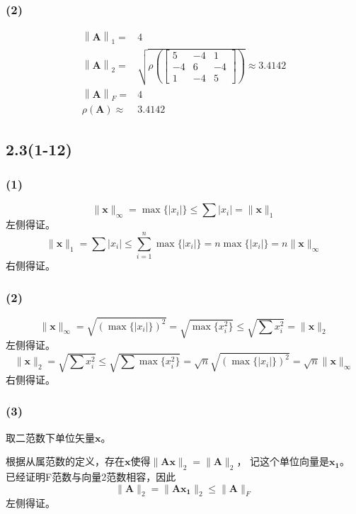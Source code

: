 \documentclass[UTF8,zihao=5]{ctexart}
\newcommand{\bm}[1]{{\mathbf{#1}}}
\begin{document}
\subsubsection*{(2)}
\begin{equation*}
    \begin{aligned}
        \left\|\bm{A}\right\|_1 =& 4\\
        \left\|\bm{A}\right\|_2 =& \sqrt{\rho\left(
            \begin{bmatrix}
                5 & -4 & 1\\-4 & 6 & -4\\1 & -4 & 5
            \end{bmatrix}
        \right)}\approx3.4142\\
        \left\|\bm{A}\right\|_F =& 4\\
        \rho(\bm{A})\approx&3.4142
    \end{aligned}
\end{equation*}

\subsection*{2.3(1-12)}
\subsubsection*{(1)}
$$
\|\bm{x}\|_\infty = \max{\{|x_i|\}}\leq\sum{|x_i|} = \|\bm{x}\|_1
$$
左侧得证。
$$
\|\bm{x}\|_1=\sum{|x_i|}\leq\sum_{i=1}^n{\max{\{|x_i|\}}}=n\max{\{|x_i|\}}
=n\|\bm{x}\|_\infty
$$
右侧得证。

\subsubsection*{(2)}
$$
\|\bm{x}\|_\infty = \sqrt{(\max{\{|x_i|\}})^2}
=\sqrt{\max{\{x_i^2\}}}\leq\sqrt{\sum{x_i^2}}=\|\bm{x}\|_2
$$
左侧得证。
$$
\|\bm{x}\|_2=\sqrt{\sum{x_i^2}}\leq\sqrt{\sum{\max{\{x_i^2\}}}}
=\sqrt{n}\sqrt{(\max{\{|x_i|\}})^2}=\sqrt{n}\|\bm{x}\|_\infty
$$
右侧得证。

\subsubsection*{(3)}
取二范数下单位矢量$\bm{x}$。

根据从属范数的定义，存在$\bm{x}$使得$\|\bm{Ax}\|_2=\|\bm{A}\|_2$，
记这个单位向量是$\bm{x_1}$。
已经证明F范数与向量2范数相容，因此
$$
\|\bm{A}\|_2=\|\bm{Ax_1}\|_2\leq\|\bm{A}\|_F
$$
左侧得证。
\end{document}
